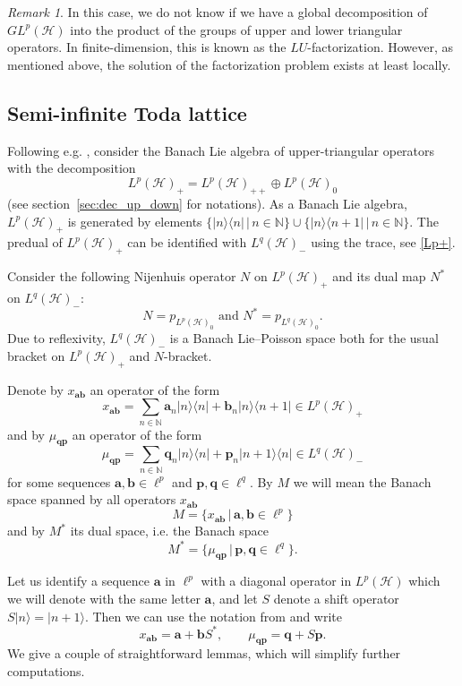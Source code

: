 \documentclass[a4paper,12pt,reqno]{amsart}%
\theoremstyle{definition}
\theoremstyle{remark}
\newtheorem{remark}[theorem]{Remark}
\numberwithin{theorem}{section}
\numberwithin{equation}{section}
\newcommand{\1}{{\bf 1}}
\newcommand\N{{\mathbb{N}}}
\renewcommand\a{{\mathbf{a}}}
\renewcommand\b{{\mathbf{b}}}
\newcommand\p{{\mathbf{p}}}
\newcommand\q{{\mathbf{q}}}
\begin{document}
\begin{remark}
    In this case, we do not know if we have a global decomposition of $GL^p(\mathcal{H})$ into the product of the groups of upper and lower triangular operators. In finite-dimension, this is known as the $LU$-factorization. However, as mentioned above, the solution of the factorization problem exists at least locally.
\end{remark}


\subsection{Semi-infinite Toda lattice}\label{sec:Toda}
Following e.g. \cite{magri90}, consider the Banach Lie algebra of upper-triangular operators with the decomposition 
\[
L^p(\mathcal H)_+=L^p(\mathcal H)_{++} \oplus L^p(\mathcal H)_0
\] 
(see section~\ref{sec:dec_up_down} for notations).
As a Banach Lie algebra, $L^p(\mathcal H)_+$ is generated by elements $\{|n\rangle\langle n|\,|\, n\in\N\} \cup \{|n\rangle\langle n+1| \,|\, n\in\N\}$. 
The predual of $L^p(\mathcal H)_+$ can be identified with $L^q(\mathcal H)_-$ using the trace, see \eqref{Lp+}.

Consider the following Nijenhuis operator $N$ on $L^p(\mathcal H)_+$ and its dual map $N^*$ on $L^q(\mathcal H)_-$:
\[
N=p_{L^p(\mathcal H)_{0}}
\textrm{    and    }
N^* = p_{L^q(\mathcal H)_{0}}.
\]
Due to reflexivity, $L^q(\mathcal H)_-$ is a Banach Lie--Poisson space both for the usual bracket on $L^p(\mathcal H)_+$ and $N$-bracket.


Denote by $x_{\a\b}$ an operator of the form
\[x_{\a\b}=\sum_{n\in \N} \a_n |n\rangle\langle n| + \b_n |n\rangle\langle n+1| \in L^p(\mathcal H)_+ \]
and by $\mu_{\q\p}$ an operator of the form
\[\mu_{\q\p}=\sum_{n\in \N} \q_n |n\rangle\langle n| + \p_n |n+1\rangle\langle n| \in L^q(\mathcal H)_- \]
for some sequences $\a,\b\in\ell^p$ and $\p,\q\in\ell^q$. 
By $M$ we will mean the Banach space spanned by all operators $x_{\a\b}$
\[ M=\{x_{\a\b} \,|\, \a,\b\in\ell^p\}\]
and by $M^*$ its dual space, i.e. the Banach space
\begin{equation}\label{M}
M^*=\{\mu_{\q\p} \,|\, \p,\q\in\ell^q\}.
\end{equation}

Let us identify a sequence $\a$ in $\ell^p$ with a diagonal operator in $L^p(\mathcal H)$ which we will denote with the same letter $\a$, and let $S$ denote a shift operator $S|n\rangle = |n+1\rangle$. Then we can use the notation from \cite{Oind} and write 
\[ x_{\a\b} = \a + \b S^*, \qquad \mu_{\q\p} = \q + S \p. \]
We give a couple of straightforward lemmas, which will simplify further computations. 
\end{document}
